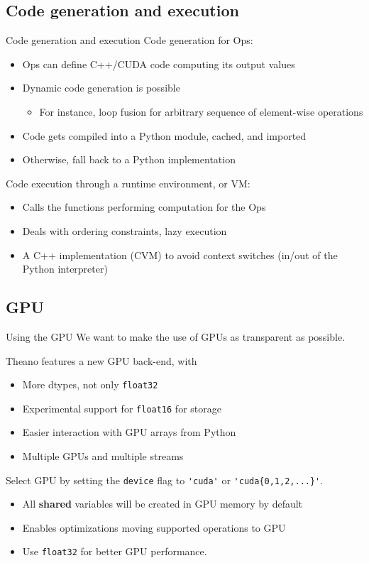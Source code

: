 \documentclass[a4paper,9pt]{beamer}
\begin{document}
\subsection{Code generation and execution}
\begin{frame}[fragile]{Code generation and execution}
  Code generation for Ops:
  \begin{itemize}
    \item Ops can define C++/CUDA code computing its output values
    \item Dynamic code generation is possible
      \begin{itemize}
        \item For instance, loop fusion for arbitrary sequence of element-wise operations
      \end{itemize}
    \item Code gets compiled into a Python module, cached, and imported
    \item Otherwise, fall back to a Python implementation
  \end{itemize}

  Code execution through a runtime environment, or VM:
  \begin{itemize}
    \item Calls the functions performing computation for the Ops
    \item Deals with ordering constraints, lazy execution
    \item A C++ implementation (CVM) to avoid context switches
      (in/out of the Python interpreter)
  \end{itemize}
\end{frame}

\subsection{GPU}
\begin{frame}[fragile]{Using the GPU}
  We want to make the use of GPUs as transparent as possible.

  Theano features a new GPU back-end, with
  \begin{itemize}
    \item More dtypes, not only \verb|float32|
    \item Experimental support for \verb|float16| for storage
    \item Easier interaction with GPU arrays from Python
    \item Multiple GPUs and multiple streams
  \end{itemize}

  Select GPU by setting the \verb|device| flag to \verb|'cuda'| or \verb|'cuda{0,1,2,...}'|.
  \begin{itemize}
    \item All {\bf shared} variables will be created in GPU memory by default
    \item Enables optimizations moving supported operations to GPU
    \item Use \verb|float32| for better GPU performance.
  \end{itemize}
\end{frame}
\end{document}
